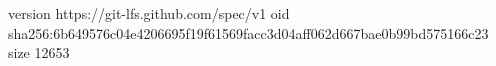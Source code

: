version https://git-lfs.github.com/spec/v1
oid sha256:6b649576c04e4206695f19f61569facc3d04aff062d667bae0b99bd575166c23
size 12653
